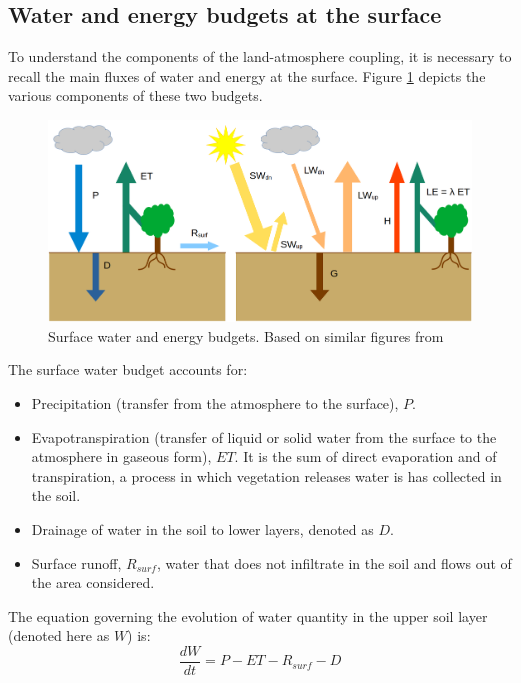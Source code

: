 \subsection{Water and energy budgets at the surface}
To understand the components of the land-atmosphere coupling, it is necessary to recall the main fluxes of water and energy at the surface. 
Figure \ref{fig:budgets} depicts the various components of these two budgets.

\begin{figure}[ht]
    \centering
    \includegraphics[width=\textwidth]{images/intro/budgets.png}
    \caption{Surface water and energy budgets. Based on similar figures from \citet{seneviratne_investigating_2010,lunel_interactions_2024}
    }
    \label{fig:budgets}
\end{figure}

The surface water budget accounts for:
\begin{itemize}
    \item Precipitation (transfer from the atmosphere to the surface), $P$.
    \item Evapotranspiration (transfer of liquid or solid water from the surface to the atmosphere in gaseous form), $ET$. It is the sum of direct evaporation and of transpiration, a process in  which vegetation releases water is has collected in the soil.
    \item Drainage of water in the soil to lower layers, denoted  as $D$. 
    \item Surface runoff, $R_{surf}$, water that does not infiltrate in the soil and flows out of the area considered.
\end{itemize}

The equation governing the evolution of water quantity in the upper soil layer (denoted here as $W$) is:
\begin{equation}
    \frac{dW}{dt} = P - ET - R_{surf} - D
\end{equation}

